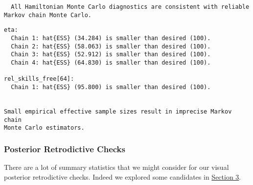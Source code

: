 \documentclass[
  letterpaper,
  DIV=11,
  numbers=noendperiod]{scrartcl}
\newenvironment{Shaded}{\begin{snugshade}}{\end{snugshade}}
\newcommand{\AttributeTok}[1]{\textcolor[rgb]{0.40,0.45,0.13}{#1}}
\newcommand{\ConstantTok}[1]{\textcolor[rgb]{0.56,0.35,0.01}{#1}}
\newcommand{\FunctionTok}[1]{\textcolor[rgb]{0.28,0.35,0.67}{#1}}
\newcommand{\NormalTok}[1]{\textcolor[rgb]{0.00,0.23,0.31}{#1}}
\newcommand{\OtherTok}[1]{\textcolor[rgb]{0.00,0.23,0.31}{#1}}
\newcommand{\SpecialCharTok}[1]{\textcolor[rgb]{0.37,0.37,0.37}{#1}}
\newcommand{\StringTok}[1]{\textcolor[rgb]{0.13,0.47,0.30}{#1}}
\begin{document}
\begin{verbatim}
  All Hamiltonian Monte Carlo diagnostics are consistent with reliable
Markov chain Monte Carlo.
\end{verbatim}

\begin{Shaded}
\end{Shaded}

\begin{verbatim}
eta:
  Chain 1: hat{ESS} (34.284) is smaller than desired (100).
  Chain 2: hat{ESS} (58.063) is smaller than desired (100).
  Chain 3: hat{ESS} (52.912) is smaller than desired (100).
  Chain 4: hat{ESS} (64.830) is smaller than desired (100).

rel_skills_free[64]:
  Chain 1: hat{ESS} (95.800) is smaller than desired (100).


Small empirical effective sample sizes result in imprecise Markov chain
Monte Carlo estimators.
\end{verbatim}

\subsubsection{Posterior Retrodictive
Checks}\label{posterior-retrodictive-checks}

There are a lot of summary statistics that we might consider for our
visual posterior retrodictive checks. Indeed we explored some candidates
in \hyperref[sec:data-exploration]{Section 3}.
\end{document}
